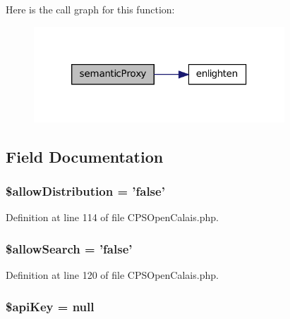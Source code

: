 Here is the call graph for this function:\nopagebreak
\begin{figure}[H]
\begin{center}
\leavevmode
\includegraphics[width=266pt]{classCPSOpenCalais_ac0b3a7b2ac4ed8f5d6b100820faedfab_cgraph}
\end{center}
\end{figure}




\subsection{Field Documentation}
\hypertarget{classCPSOpenCalais_a2989023b45237cd246c557e99bf994b6}{
\subsubsection[{\$allowDistribution}]{\setlength{\rightskip}{0pt plus 5cm}\$allowDistribution = 'false'}}
\label{classCPSOpenCalais_a2989023b45237cd246c557e99bf994b6}


Definition at line 114 of file CPSOpenCalais.php.

\hypertarget{classCPSOpenCalais_a128c7ee55d4a7c1aa84c8b65a88d6862}{
\subsubsection[{\$allowSearch}]{\setlength{\rightskip}{0pt plus 5cm}\$allowSearch = 'false'}}
\label{classCPSOpenCalais_a128c7ee55d4a7c1aa84c8b65a88d6862}


Definition at line 120 of file CPSOpenCalais.php.

\hypertarget{classCPSOpenCalais_a084e3db37d1b117a3cc7212cf2eed533}{
\subsubsection[{\$apiKey}]{\setlength{\rightskip}{0pt plus 5cm}\$apiKey = null}}
\label{classCPSOpenCalais_a084e3db37d1b117a3cc7212cf2eed533}


